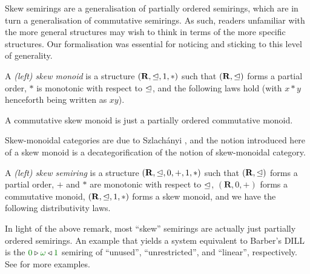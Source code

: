 \documentclass[submission,copyright,creativecommons]{eptcs}
\begin{document}
Skew semirings are a generalisation of partially ordered semirings, which are in turn a
generalisation of commutative semirings.
As such, readers unfamiliar with the more general structures may wish to think
in terms of the more specific structures.
Our formalisation was essential for noticing and sticking to this level of
generality.

\begin{definition}
  A \emph{(left) skew monoid} is a structure $(\mathbf R, \trianglelefteq, 1, *)$ such
  that $(\mathbf R, \trianglelefteq)$ forms a partial order, $*$ is monotonic with
  respect to $\trianglelefteq$, and the following laws hold (with $x * y$ henceforth
  being written as $xy$).
\end{definition}

\begin{remark}
  A commutative skew monoid is just a partially ordered commutative monoid.
\end{remark}

Skew-monoidal categories are due to Szlach\'anyi \cite{skew}, and the notion
introduced here of a skew monoid is a decategorification of the notion of
skew-monoidal category.

\begin{definition}
  A \emph{(left) skew semiring} is a structure
  $(\mathbf R, \trianglelefteq, 0, +, 1, *)$ such that $(\mathbf R, \trianglelefteq)$ forms a
  partial order, $+$ and $*$ are monotonic with respect to $\trianglelefteq$,
  $(\mathbf R, 0, +)$ forms a commutative monoid, $(\mathbf R, \trianglelefteq, 1, *)$
  forms a skew monoid, and we have the following distributivity laws.
\end{definition}

\begin{example}
  In light of the above remark, most ``skew'' semirings are actually
  just partially ordered semirings. An example that yields a system
  equivalent to Barber's DILL is the
  $\zero \triangleright \unrestricted \triangleleft \linear$
  semiring of ``unused'', ``unrestricted'', and ``linear'', respectively.
  See \cite{Granule18} for more examples.
\end{example}
\end{document}
